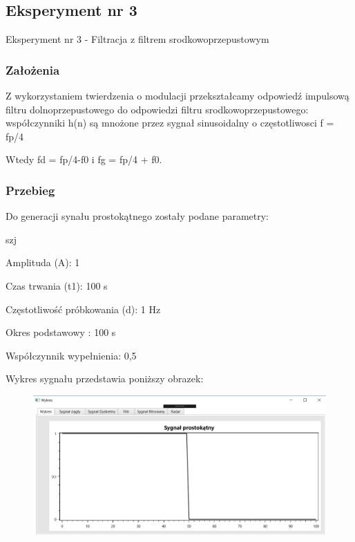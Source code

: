 \documentclass[12pt]{article}
\begin{document}

\subsection{Eksperyment nr 3}

Eksperyment nr 3  - Filtracja z filtrem srodkowoprzepustowym
\subsubsection{Założenia}
Z wykorzystaniem twierdzenia o modulacji przekształcamy odpowiedź impulsową filtru dolnoprzepustowego do odpowiedzi filtru srodkowoprzepustowego:
współczynniki h(n) są mnożone przez sygnał sinusoidalny  o częstotliwosci f = fp/4

Wtedy fd = fp/4-f0 i fg = fp/4 + f0.

\subsubsection{Przebieg}
Do generacji synału prostokątnego zostały podane parametry:

\begin{labeling}{szj}
\item [Amplituda (A):] 1
\item [Czas trwania (t1):] 100 s
\item [Częstotliwość próbkowania (d): ] 1 Hz
\item [Okres podstawowy :] 100 s
\item [Współczynnik wypełnienia:] 0,5
\end{labeling}

Wykres sygnału przedstawia poniższy obrazek:
\begin{figure}[h!]
 \centering
 \includegraphics[width=12.3cm]{prost.PNG}
 \vspace{-0.3cm}
 \label{gw}
\end{figure}
\end{document}
